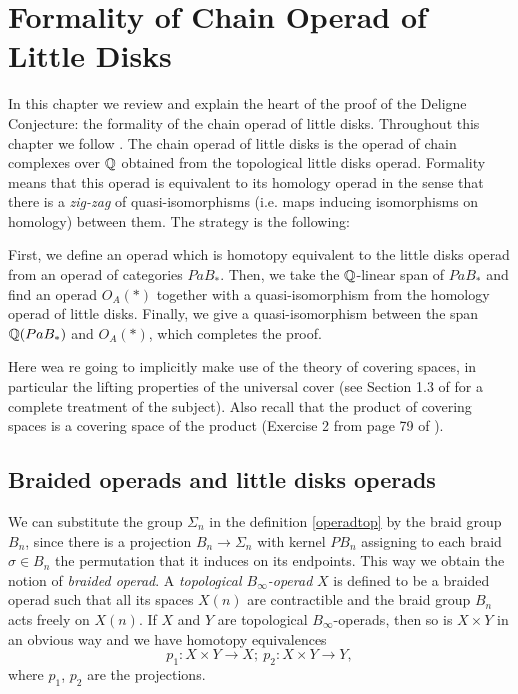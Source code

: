 \documentclass[TFM.tex]{subfiles}
\begin{document}
\chapter{Formality of Chain Operad of Little Disks}\label{4}



%
%
%


In this chapter we review and explain the heart of the proof of the Deligne Conjecture: the formality of the chain operad of little disks. Throughout this chapter we follow \cite{Tamarkin}. The chain operad of little disks is the operad of chain complexes over $\mathbb{Q}$ obtained from the topological little disks operad. Formality means that this operad is equivalent to its homology operad in the sense that there is a \emph{zig-zag} of quasi-isomorphisms (i.e. maps inducing isomorphisms on homology) between them. The strategy is the following:

 First, we define an operad which is homotopy equivalent to the little disks operad from an operad of categories $PaB_*$. Then, we take the $\mathbb{Q}$-linear span of $PaB_*$ and find an operad $O_A(*)$ together with a quasi-isomorphism from the homology operad of little disks. Finally, we give a quasi-isomorphism between the span $\mathbb{Q}(PaB_*)$ and $O_A(*)$, which completes the proof. 

 Here wea re going to implicitly make use of the theory of covering spaces, in particular the lifting properties of the universal cover (see Section 1.3 of \cite{Hatcher} for a complete treatment of the subject). Also recall that the product of covering spaces is a covering space of the product (Exercise 2 from page 79 of \cite{Hatcher}).


\section{Braided operads and little disks operads}

We can substitute the group $\Sigma_n$ in the definition \ref{operadtop} by the braid group $B_n$, since there is a projection $B_n\to \Sigma_n$ with kernel $PB_n$ assigning to each braid $\sigma\in B_n$ the permutation that it induces on its endpoints. This way we obtain the notion of \emph{braided operad}. A \emph{topological $B_\infty$-operad} $X$ is defined to be a braided operad such that all its spaces $X(n)$ are contractible and the braid group $B_n$ acts freely on $X(n)$. If $X$ and $Y$ are topological $B_\infty$-operads, then so is $X\times Y$ in an obvious way and we have homotopy equivalences 
\begin{equation}\label{projections}
p_1:X\times Y\to X;\ p_2:X\times Y\to Y,
\end{equation}
where $p_1$, $p_2$ are the projections. 
\end{document}
